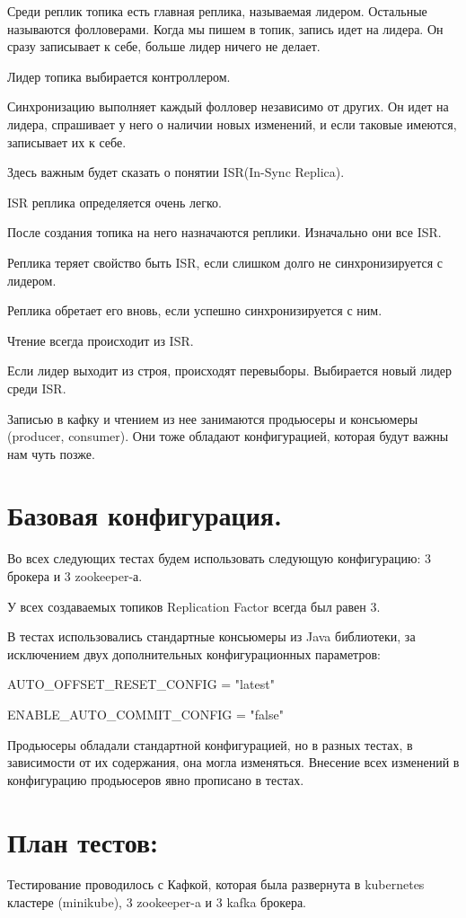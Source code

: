 \documentclass[11pt]{article}
\begin{document}
    Среди реплик топика есть главная реплика, называемая лидером. Остальные называются фолловерами. Когда мы пишем в
    топик, запись идет на лидера. Он сразу записывает к себе, больше лидер ничего не делает.

    Лидер топика выбирается контроллером.

    Синхронизацию выполняет каждый фолловер независимо от других. Он идет на лидера, спрашивает у него о наличии
    новых изменений, и если таковые имеются, записывает их к себе.

    Здесь важным будет сказать о понятии ISR(In-Sync Replica).

    ISR реплика определяется очень легко.

    После создания топика на него назначаются реплики. Изначально они все ISR.

    Реплика теряет свойство быть ISR, если слишком долго не синхронизируется с лидером.

    Реплика обретает его вновь, если успешно синхронизируется с ним.

    Чтение всегда происходит из ISR.

    Если лидер выходит из строя, происходят перевыборы. Выбирается новый лидер среди ISR.

    Записью в кафку и чтением из нее занимаются продьюсеры и консьюмеры (producer, consumer). Они тоже обладают
    конфигурацией, которая будут важны нам чуть позже.

    \section{Базовая конфигурация.}
    Во всех следующих тестах будем использовать следующую конфигурацию: 3 брокера и 3 zookeeper-а.

    У всех создаваемых топиков Replication Factor всегда был равен 3.

    В тестах использовались стандартные консьюмеры из Java библиотеки, за исключением двух дополнительных
    конфигурационных параметров:

    AUTO\_OFFSET\_RESET\_CONFIG = "latest"

    ENABLE\_AUTO\_COMMIT\_CONFIG = "false"

    Продьюсеры обладали стандартной конфигурацией, но в разных тестах, в зависимости от их содержания, она могла
    изменяться. Внесение всех изменений в конфигурацию продьюсеров явно прописано в тестах.
    \section{План тестов:}
    Тестирование проводилось с Кафкой, которая была развернута в kubernetes кластере (minikube), 3 zookeeper-a и 3
    kafka
    брокера.
\end{document}
